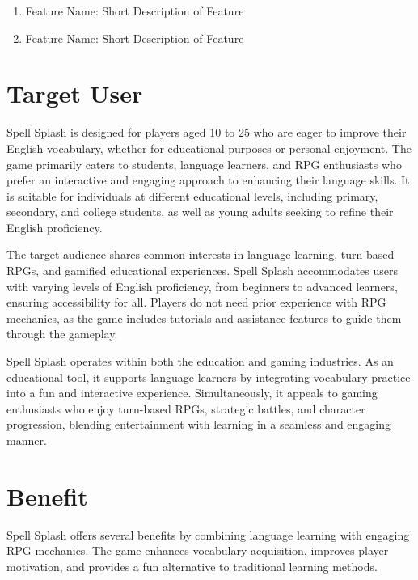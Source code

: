 \begin{enumerate}[leftmargin=80pt]
    \item Feature Name: Short Description of Feature
    \item Feature Name: Short Description of Feature
\end{enumerate}

\section{Target User}
\label{section:target-user}

Spell Splash is designed for players aged 10 to 25 who are eager to improve their English vocabulary, whether for educational purposes or personal enjoyment. The game primarily caters to students, language learners, and RPG enthusiasts who prefer an interactive and engaging approach to enhancing their language skills. It is suitable for individuals at different educational levels, including primary, secondary, and college students, as well as young adults seeking to refine their English proficiency.


The target audience shares common interests in language learning, turn-based RPGs, and gamified educational experiences. Spell Splash accommodates users with varying levels of English proficiency, from beginners to advanced learners, ensuring accessibility for all. Players do not need prior experience with RPG mechanics, as the game includes tutorials and assistance features to guide them through the gameplay. 


Spell Splash operates within both the education and gaming industries. As an educational tool, it supports language learners by integrating vocabulary practice into a fun and interactive experience. Simultaneously, it appeals to gaming enthusiasts who enjoy turn-based RPGs, strategic battles, and character progression, blending entertainment with learning in a seamless and engaging manner.


\section{Benefit}
\label{section:benefit}

Spell Splash offers several benefits by combining language learning with engaging RPG mechanics. The game enhances vocabulary acquisition, improves player motivation, and provides a fun alternative to traditional learning methods.

\vspace{1em}

